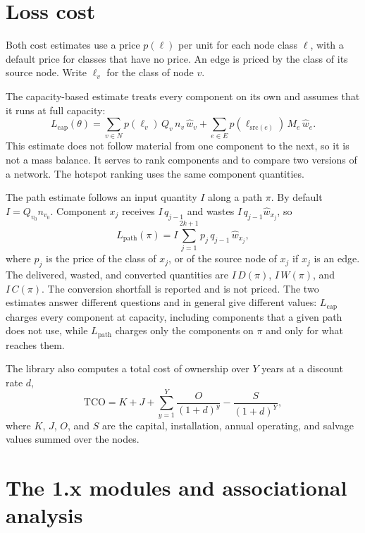 \documentclass[12pt]{article}
\theoremstyle{plain}
\theoremstyle{definition}
\begin{document}
\section{Loss cost}\label{sec:cost}

Both cost estimates use a price $p(\ell)$ per unit for each node class $\ell$, with a default price for classes that have no price. An edge is priced by the class of its source node. Write $\ell_v$ for the class of node $v$.

The capacity-based estimate treats every component on its own and assumes that it runs at full capacity:
\begin{equation}\label{eq:lcap}
    L_{\mathrm{cap}}(\theta)=\sum_{v\in N} p(\ell_v)\,Q_v\,n_v\,\hat w_v+\sum_{e\in E} p(\ell_{\mathrm{src}(e)})\,M_e\,\hat w_e .
\end{equation}
This estimate does not follow material from one component to the next, so it is not a mass balance. It serves to rank components and to compare two versions of a network. The hotspot ranking uses the same component quantities.

The path estimate follows an input quantity $I$ along a path $\pi$. By default $I=Q_{v_0}n_{v_0}$. Component $x_j$ receives $I\,q_{j-1}$ and wastes $I\,q_{j-1}\hat w_{x_j}$, so
\begin{equation}\label{eq:lpath}
    L_{\mathrm{path}}(\pi)=I\sum_{j=1}^{2k+1} p_j\,q_{j-1}\,\hat w_{x_j},
\end{equation}
where $p_j$ is the price of the class of $x_j$, or of the source node of $x_j$ if $x_j$ is an edge. The delivered, wasted, and converted quantities are $I\,D(\pi)$, $I\,W(\pi)$, and $I\,C(\pi)$. The conversion shortfall is reported and is not priced. The two estimates answer different questions and in general give different values: $L_{\mathrm{cap}}$ charges every component at capacity, including components that a given path does not use, while $L_{\mathrm{path}}$ charges only the components on $\pi$ and only for what reaches them.

The library also computes a total cost of ownership over $Y$ years at a discount rate $d$,
\begin{equation}\label{eq:tco}
    \mathrm{TCO}=K+J+\sum_{y=1}^{Y}\frac{O}{(1+d)^{y}}-\frac{S}{(1+d)^{Y}},
\end{equation}
where $K$, $J$, $O$, and $S$ are the capital, installation, annual operating, and salvage values summed over the nodes.

\section{The 1.x modules and associational analysis}\label{sec:legacy}
\end{document}
